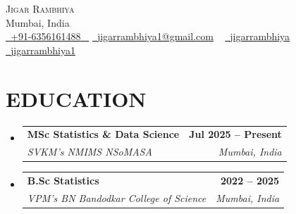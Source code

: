 \documentclass[letterpaper,11pt]{article}
\makeatletter
\newcommand{\resumeSubheading}[4]{
  \vspace{-2pt}\item
    \begin{tabular*}{1.0\textwidth}[t]{l@{\extracolsep{\fill}}r}
      \textbf{\large#1} & \textbf{\small #2} \\
      \textit{\large#3} & \textit{\small #4} \\
     
    \end{tabular*}\vspace{-7pt}
}
\newcommand{\resumeSubHeadingListStart}{\begin{itemize}[leftmargin=0.0in, label={}]}
\newcommand{\resumeSubHeadingListEnd}{\end{itemize}}
\makeatother
\begin{document}
\begin{center}
    {\Huge \scshape Jigar Rambhiya} \\ \vspace{1pt}
    Mumbai, India \\ \vspace{1pt}
    \small \href{tel:+916356161488}{ \raisebox{-0.1\height}\faPhone\ \underline{+91-6356161488} ~} \href{mailto:jigarrambhiya1@gmail.com}{\raisebox{-0.2\height}\faEnvelope\  \underline{jigarrambhiya1@gmail.com}} ~
    \href{https://www.linkedin.com/in/jigarrambhiya}{\raisebox{-0.2\height}\faLinkedinSquare\ \underline{jigarrambhiya}}  ~
    \href{https://github.com/jigarrambhiya1}{\raisebox{-0.2\height}\faGithub\ \underline{jigarrambhiya1}} ~
\end{center}



\section{EDUCATION}
  \resumeSubHeadingListStart
    \resumeSubheading
      {MSc Statistics \& Data Science}{Jul 2025 -- Present}
      {SVKM's NMIMS NSoMASA}{Mumbai, India}
  \resumeSubHeadingListEnd
    \vspace{-10pt}  
  
 
  \resumeSubHeadingListStart
    \resumeSubheading
      {B.Sc Statistics}{2022 -- 2025}
      {VPM's BN Bandodkar College of Science}{Mumbai, India}
  \resumeSubHeadingListEnd 







  
 
\end{document}
